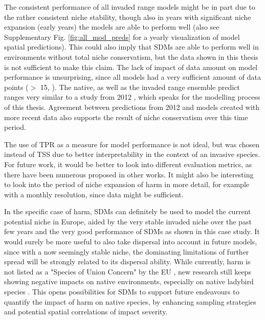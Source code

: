 \documentclass[12pt,a4paper]{article}
\begin{document}
The consistent performance of all invaded range models might be in part due to the rather consistent niche stability, though also in years with significant niche expansion (early years) the models are able to perform well (also see Supplementary Fig. \ref{fig:all_mod_preds} for a yearly visualization of model spatial predictions).
This could also imply that SDMs are able to perform well in environments without total niche conservatism, but the data shown in this thesis is not sufficient to make this claim.
The lack of impact of data amount on model performance is unsurprising, since all models had a very sufficient amount of data points ($>$ 15, \autocite{stoa2019SDMdata}).
The native, as well as the invaded range ensemble predict ranges very similar to a study from 2012 \autocite{bidinger2012harmSDMglobalMaxent}, which speaks for the modelling process of this thesis.
Agreement between predictions from 2012 and models created with more recent data also supports the result of niche conservatism over this time period.

The use of TPR as a measure for model performance is not ideal, but was chosen instead of TSS due to better interpretability in the context of an invasive species.
For future work, it would be better to look into different evaluation metrics, as there have been numerous proposed in other works.
It might also be interesting to look into the period of niche expansion of \gls{harm} in more detail, for example with a monthly resolution, since data might be sufficient.

In the specific case of \gls{harm}, SDMs can definitely be used to model the current potential niche in Europe, aided by the very stable invaded niche over the past few years and the very good performance of SDMs as shown in this case study.
It would surely be more useful to also take dispersal into account in future models, since with a now seemingly stable niche, the dominating limitations of further spread will be strongly related to its dispersal ability.
While currently, \gls{harm} is not listed as a "Species of Union Concern" by the EU \autocite{EU2020speciesofunionconcern}, new research still keeps showing negative impacts on native environments, especially on native ladybird species \autocite{brown2022harmimpactigp}.
This opens possibilities for SDMs to support future endeavours to quantify the impact of \gls{harm} on native species, by enhancing sampling strategies and potential spatial correlations of impact severity.
\end{document}
